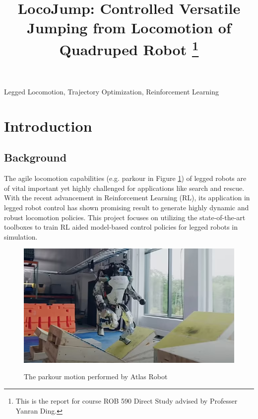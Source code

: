 \documentclass[11pt, conference]{IEEEtran}
\theoremstyle{definition} %
\begin{document}
\title{LocoJump: Controlled Versatile Jumping from Locomotion of Quadruped Robot
\thanks{This is the report for course ROB 590 Direct Study advised by Professer Yanran Ding.}%
}

\author{
}

\maketitle


\begin{IEEEkeywords}
Legged Locomotion, Trajectory Optimization, Reinforcement Learning
\end{IEEEkeywords}


\section{Introduction}

\subsection{Background}
The agile locomotion capabilities (e.g. parkour in Figure \ref{fig:parkour_atlas}) of legged robots are of vital important yet highly challenged for applications like search and rescue. With the recent advancement in Reinforcement Learning (RL), its application in legged robot control has shown promising result to generate highly dynamic and robust locomotion policies. This project focuses on utilizing the state-of-the-art toolboxes to train RL aided model-based control policies for legged robots in simulation.


\begin{figure}[htb]
    \centering
        \textsf{\includegraphics[width=0.9\columnwidth]{figures/parkour_atlas.png}}
        \caption{The parkour motion performed by Atlas Robot}
        \label{fig:parkour_atlas}
\end{figure}
\end{document}

